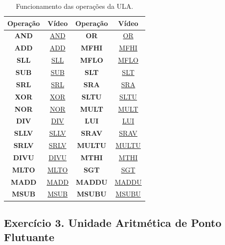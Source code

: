 \documentclass[12pt]{article}
\begin{document}
\begin{table}[H]
	\centering
	\begin{tabular}{|c|c|c|c|}
		\hline
		\textbf{Operação} & \textbf{Vídeo} & \textbf{Operação} & \textbf{Vídeo} \\
		\hline
		\textbf{AND} & \href{https://youtu.be/3rOvkaxYP6Q}{AND}  & \textbf{OR} & \href{https://youtu.be/sCqV4z5Az1Q}{OR} \\\hline
		\textbf{ADD} &  \href{https://youtu.be/PtU2MOLjm94}{ADD} & \textbf{MFHI} &  \href{}{MFHI} \\\hline
		\textbf{SLL} &  \href{https://youtu.be/oegfAdN_HYc}{SLL}  & \textbf{MFLO} &  \href{}{MFLO}  \\\hline
		\textbf{SUB} &  \href{https://youtu.be/jSYAjTycOTo}{SUB}  & \textbf{SLT} &  \href{https://youtu.be/I3R0-LyBugU}{SLT}  \\\hline
		\textbf{SRL} &  \href{https://youtu.be/wdsBH2myWbc}{SRL} & \textbf{SRA} &  \href{https://youtu.be/aSTUbG23kdI}{SRA}   \\\hline
		\textbf{XOR}  &  \href{}{XOR}  & \textbf{SLTU} &  \href{https://youtu.be/IazxX0OtrLE}{SLTU} \\\hline
		\textbf{NOR} &  \href{}{NOR} & \textbf{MULT} &  \href{https://youtu.be/TvRZG23bw78}{MULT} \\\hline
		\textbf{DIV} &  \href{https://youtu.be/l3nE2rxqUuY}{DIV}  & \textbf{LUI} &  \href{https://youtu.be/lTs8LDFBiIE}{LUI} \\\hline
		\textbf{SLLV} &  \href{https://youtu.be/e2SjS3GcqtE}{SLLV}  & \textbf{SRAV} &  \href{}{SRAV} \\\hline
		\textbf{SRLV} &  \href{}{SRLV}  & \textbf{MULTU} &  \href{}{MULTU} \\\hline
		\textbf{DIVU} &  \href{}{DIVU}  & \textbf{MTHI}  &  \href{}{MTHI} \\\hline
		\textbf{MLTO} &  \href{}{MLTO}  & \textbf{SGT} &  \href{}{SGT} \\\hline
		\textbf{MADD} &  \href{}{MADD}  & \textbf{MADDU} &  \href{}{MADDU} \\\hline
		\textbf{MSUB} &  \href{}{MSUB}  & \textbf{MSUBU}  &  \href{}{MSUBU} \\\hline
	\end{tabular}
	\caption{Funcionamento das operações da ULA.}
	\label{tab:youtubeULA}
\end{table}


\subsection{Exercício 3. Unidade Aritmética de Ponto Flutuante }
\label{subsec:ulafloat}
\end{document}
